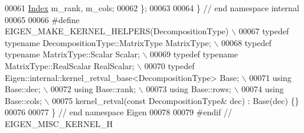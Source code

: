 \begin{DoxyCode}
00061     \hyperlink{namespace_eigen_a62e77e0933482dafde8fe197d9a2cfde}{Index} m\_rank, m\_cols;
00062 \};
00063 
00064 \} \textcolor{comment}{// end namespace internal}
00065 
00066 \textcolor{preprocessor}{#define EIGEN\_MAKE\_KERNEL\_HELPERS(DecompositionType) \(\backslash\)}
00067 \textcolor{preprocessor}{  typedef typename DecompositionType::MatrixType MatrixType; \(\backslash\)}
00068 \textcolor{preprocessor}{  typedef typename MatrixType::Scalar Scalar; \(\backslash\)}
00069 \textcolor{preprocessor}{  typedef typename MatrixType::RealScalar RealScalar; \(\backslash\)}
00070 \textcolor{preprocessor}{  typedef Eigen::internal::kernel\_retval\_base<DecompositionType> Base; \(\backslash\)}
00071 \textcolor{preprocessor}{  using Base::dec; \(\backslash\)}
00072 \textcolor{preprocessor}{  using Base::rank; \(\backslash\)}
00073 \textcolor{preprocessor}{  using Base::rows; \(\backslash\)}
00074 \textcolor{preprocessor}{  using Base::cols; \(\backslash\)}
00075 \textcolor{preprocessor}{  kernel\_retval(const DecompositionType& dec) : Base(dec) \{\}}
00076 
00077 \} \textcolor{comment}{// end namespace Eigen}
00078 
00079 \textcolor{preprocessor}{#endif // EIGEN\_MISC\_KERNEL\_H}
\end{DoxyCode}
